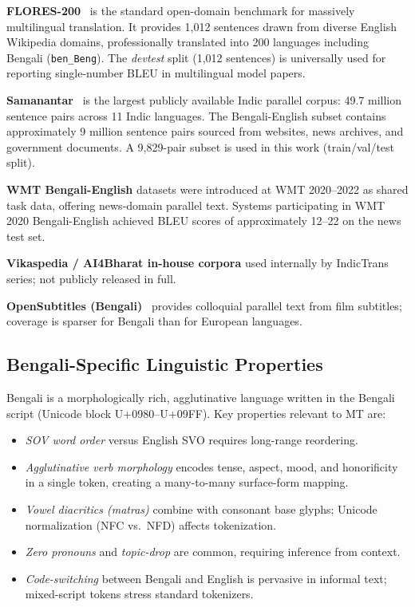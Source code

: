 \documentclass[conference]{IEEEtran}
\begin{document}
\textbf{FLORES-200}~\cite{nllb2022} is the standard open-domain benchmark
for massively multilingual translation.
It provides 1,012 sentences drawn from diverse English Wikipedia domains,
professionally translated into 200 languages including Bengali
(\texttt{ben\_Beng}).
The \textit{devtest} split (1,012 sentences) is universally used for
reporting single-number BLEU in multilingual model papers.

\textbf{Samanantar}~\cite{ramesh2022samanantar} is the largest publicly
available Indic parallel corpus: 49.7 million sentence pairs across 11
Indic languages.
The Bengali-English subset contains approximately 9 million sentence pairs
sourced from websites, news archives, and government documents.
A 9,829-pair subset is used in this work (train/val/test split).

\textbf{WMT Bengali-English} datasets were introduced at WMT 2020--2022
as shared task data, offering news-domain parallel text.
Systems participating in WMT 2020 Bengali-English achieved BLEU scores
of approximately 12--22 on the news test set.

\textbf{Vikaspedia / AI4Bharat in-house corpora} used internally by
IndicTrans series; not publicly released in full.

\textbf{OpenSubtitles (Bengali)}~\cite{lison2016opensubtitles} provides
colloquial parallel text from film subtitles; coverage is sparser for
Bengali than for European languages.

\subsection{Bengali-Specific Linguistic Properties}

Bengali is a morphologically rich, agglutinative language written in the
Bengali script (Unicode block U+0980--U+09FF).
Key properties relevant to MT are:
\begin{itemize}
  \item \textit{SOV word order} versus English SVO requires long-range
    reordering.
  \item \textit{Agglutinative verb morphology} encodes tense, aspect,
    mood, and honorificity in a single token, creating a many-to-many
    surface-form mapping.
  \item \textit{Vowel diacritics (matras)} combine with consonant base
    glyphs; Unicode normalization (NFC vs.\ NFD) affects tokenization.
  \item \textit{Zero pronouns} and \textit{topic-drop} are common,
    requiring inference from context.
  \item \textit{Code-switching} between Bengali and English is pervasive
    in informal text; mixed-script tokens stress standard tokenizers.
\end{itemize}
\end{document}
